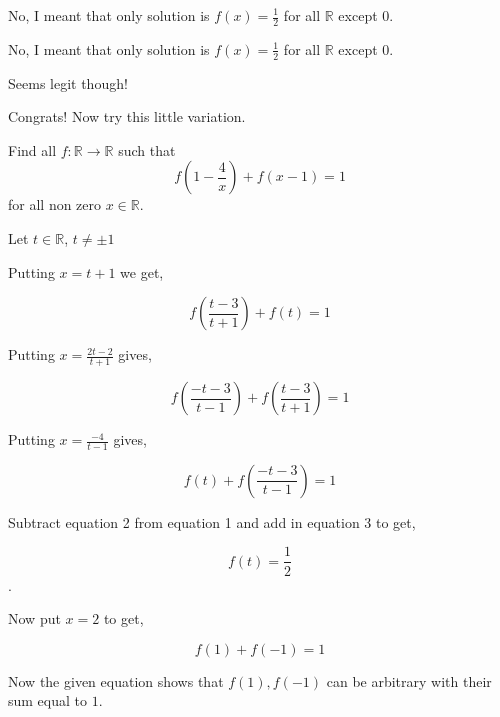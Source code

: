 \begin{solution}
	No, I meant that only solution is $f(x) = \frac{1}{2}$ for all $\mathbb{R}$ except $0$.
\end{solution}



\begin{solution}
	\begin{tcolorbox}No, I meant that only solution is $f(x) = \frac{1}{2}$ for all $\mathbb{R}$ except $0$.\end{tcolorbox}

Seems legit though!
\end{solution}



\begin{solution}
	\begin{tcolorbox}Congrats! Now try this little variation.

Find all $f: \mathbb{R}\to\mathbb{R}$ such that $$f\left(1-\frac{4}{x}\right) + f(x-1) = 1$$ for all non zero $x \in \mathbb{R}$.\end{tcolorbox}

Let $t \in \mathbb {R}$, $t \neq \pm 1$

Putting $x=t+1$ we get,

$$f(\frac{t-3}{t+1}) + f(t) =1$$

Putting $x= \frac{2t-2}{t+1}$ gives,

$$f( \frac{-t-3}{t-1} ) + f( \frac{t-3}{t+1}) =1$$

Putting $x= \frac{-4}{t-1}$ gives,

$$f(t) + f( \frac{-t-3}{t-1} ) =1$$

Subtract equation 2 from equation 1 and add in equation 3 to get,

$$f(t)= \frac{1}{2}$$.

Now put $x=2$ to get,

$$f(1) + f(-1) =1$$

Now the given equation shows that $f(1),f(-1) $ can be arbitrary with their sum equal to $1$.
\end{solution}



